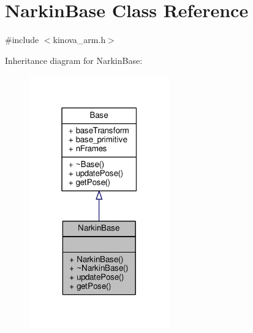 \hypertarget{class_narkin_base}{}\section{Narkin\+Base Class Reference}
\label{class_narkin_base}


{\ttfamily \#include $<$kinova\+\_\+arm.\+h$>$}



Inheritance diagram for Narkin\+Base\+:
\nopagebreak
\begin{figure}[H]
\begin{center}
\leavevmode
\includegraphics[width=171pt]{class_narkin_base__inherit__graph}
\end{center}
\end{figure}


